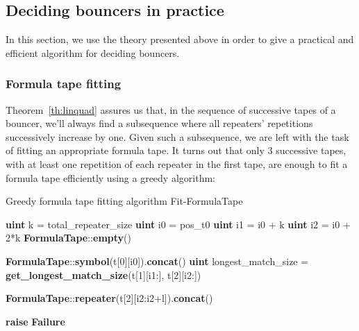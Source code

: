 \subsection{Deciding bouncers in practice}

In this section, we use the theory presented above in order to give a practical and efficient algorithm for deciding bouncers.

\subsubsection{Formula tape fitting}

Theorem~\ref{th:linquad} assures us that, in the sequence of successive tapes of a bouncer, we'll always find a subsequence where all repeaters' repetitions successively increase by one. Given such a subsequence, we are left with the task of fitting an appropriate formula tape. It turns out that only 3 successive tapes, with at least one repetition of each repeater in the first tape, are enough to fit a formula tape efficiently using a greedy algorithm:

\begin{algorithm}
    \caption{Greedy formula tape fitting algorithm {\sc Fit-FormulaTape}}\label{alg:greedy-formula-tape-fitting}
    \begin{algorithmic}[1]


        \State \textbf{uint} k = total\_repeater\_size
        \State \textbf{uint} i0 = pos\_t0
        \State \textbf{uint} i1 = i0 + k
        \State \textbf{uint} i2 = i0 + 2*k
        \State
        \State \Return \textbf{FormulaTape}::\textbf{empty}()

        \EndIf
        \State
        \State \Return \textbf{FormulaTape}::\textbf{symbol}(t[0][i0]).\textbf{concat}()
        \EndIf
        \State
        \State
        \textbf{uint} longest\_match\_size = \textbf{get\_longest\_match\_size}(t[1][i1:], t[2][i2:])
        \State

        \State \Return \textbf{FormulaTape}::\textbf{repeater}(t[2][i2:i2+l]).\textbf{concat}()
        \EndIf

        \EndFor
        \State
        \State \textbf{raise} \textbf{Failure}
        \EndProcedure
    \end{algorithmic}
\end{algorithm}

